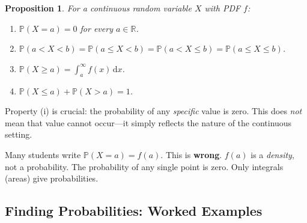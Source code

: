 \documentclass[12pt, a4paper, oneside]{book}
\theoremstyle{definition}
\theoremstyle{plain}
\newtheorem{proposition}{Proposition}[section]
\theoremstyle{remark}
\newcommand{\Prob}{\mathbb{P}}
\newcommand{\R}{\mathbb{R}}
\begin{document}
\begin{proposition}
For a continuous random variable $X$ with PDF $f$:
\begin{enumerate}[label=\textbf{(\roman*)}]
  \item $\Prob(X = a) = 0$ for every $a \in \R$.
  \item $\Prob(a < X < b) = \Prob(a \le X < b) = \Prob(a < X \le b) = \Prob(a \le X \le b)$.
  \item $\Prob(X \ge a) = \int_a^\infty f(x)\,\mathrm{d}x$.
  \item $\Prob(X \le a) + \Prob(X > a) = 1$.
\end{enumerate}
\end{proposition}

Property (i) is crucial: the probability of any \emph{specific} value is
zero.  This does \emph{not} mean that value cannot occur---it simply reflects
the nature of the continuous setting.

\begin{examtrap}
Many students write $\Prob(X = a) = f(a)$.  This is \textbf{wrong}.
$f(a)$ is a \emph{density}, not a probability.  The probability of any
single point is zero.  Only integrals (areas) give probabilities.
\end{examtrap}

\subsection{Finding Probabilities: Worked Examples}
\end{document}
